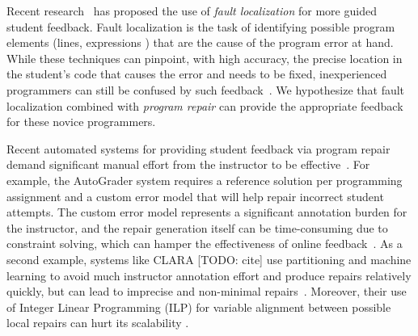 Recent research~\citep[][]{Seidel:2017, Zhang2014-lv} has proposed the use of
\emph{fault localization} for more guided student feedback. Fault localization is the
task of identifying possible program elements (\eg lines, expressions \etc) that
are the cause of the program error at hand. While these techniques can pinpoint,
with high accuracy, the precise location in the student's code that causes the
error and needs to be fixed, inexperienced programmers can still be confused by
such feedback~\cite{FIXME}. We hypothesize that fault localization combined with
\emph{program repair}
can provide the appropriate feedback for these novice programmers.

Recent automated systems for providing student feedback via program repair
demand significant manual effort from the instructor to be
effective~\cite{FIXME}. For example, the AutoGrader system requires a
reference solution per programming assignment and a custom error model that
will help
repair incorrect student attempts. The custom error model represents a
significant annotation burden for the instructor, and the repair generation
itself can be time-consuming due to constraint solving, which can hamper
the effectiveness of online feedback~\cite{FIXME}.
As a second example, systems like CLARA [TODO: cite] use
partitioning and machine learning to avoid much instructor annotation effort
and produce repairs relatively quickly, but can
lead to
imprecise and non-minimal repairs~\cite{FIXME}.
Moreover, their use of Integer Linear
Programming (ILP) for variable alignment between possible local repairs can hurt
its scalability .

